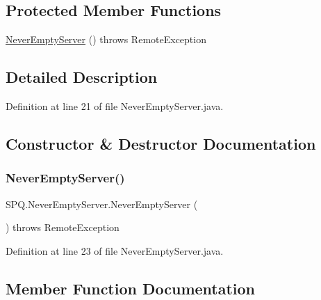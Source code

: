 \subsection*{Protected Member Functions}
\begin{DoxyCompactItemize}
\item 
\mbox{\hyperlink{class_s_p_q_1_1_never_empty_server_a5cec4d4f1ec13bf31974d58182e82170}{Never\+Empty\+Server}} ()  throws Remote\+Exception 
\end{DoxyCompactItemize}


\subsection{Detailed Description}


Definition at line 21 of file Never\+Empty\+Server.\+java.



\subsection{Constructor \& Destructor Documentation}
\mbox{\label{class_s_p_q_1_1_never_empty_server_a5cec4d4f1ec13bf31974d58182e82170}} 
\subsubsection{\texorpdfstring{Never\+Empty\+Server()}{NeverEmptyServer()}}
{\footnotesize\ttfamily S\+P\+Q.\+Never\+Empty\+Server.\+Never\+Empty\+Server (\begin{DoxyParamCaption}{ }\end{DoxyParamCaption}) throws Remote\+Exception\hspace{0.3cm}{\ttfamily [protected]}}



Definition at line 23 of file Never\+Empty\+Server.\+java.



\subsection{Member Function Documentation}
\mbox{\label{class_s_p_q_1_1_never_empty_server_ad8c5a0afa259c6b8bcc2eb2444742ca2}} 
